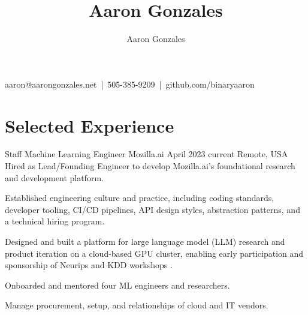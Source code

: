 \documentclass[print]{ag-cv} %
\title{Aaron Gonzales}
\author{Aaron Gonzales}
\makeatletter
\renewcommand\maketitle{
{\raggedright %
{\smallheaderfont aaron@aarongonzales.net~|~505-385-9209~|~github.com/binaryaaron}\\
\vspace{3mm}
{\headingfont \bfseries \@title }
}
} %
\makeatother
\begin{document}
\pagestyle{fancy} %
\fancyhf{}
\fancyhead{}
\fancyfoot{}
\cfoot{}
\renewcommand{\headrulewidth}{0pt}
\renewcommand{\footrulewidth}{0pt}
\maketitle

\raggedright
\section*{Selected Experience}

\begin{job}
  {Staff Machine Learning Engineer}
  {Mozilla.ai}
  {April 2023}
  {current}
  {Remote, USA}
  {
  Hired as Lead/Founding Engineer to develop Mozilla.ai's foundational research and development platform.
  }
{
  \begin{myitemize}
    \item Established engineering culture and practice, including coding
    standards, developer tooling, CI/CD pipelines, API design styles,
    abstraction patterns, and a technical hiring program. 
    \item Designed and built a platform for large language model (LLM) research
    and product iteration on a cloud-based GPU cluster, enabling early
    participation and sponsorship of Neurips and KDD workshops \autocite{kdd_2023_workshop,neurips_llm_efficiency_2023}. 
    \item Onboarded and mentored four ML engineers and researchers. 
    \item Manage procurement, setup, and relationships of cloud and IT vendors.
  \end{myitemize}
}
\end{job}
\end{document}
